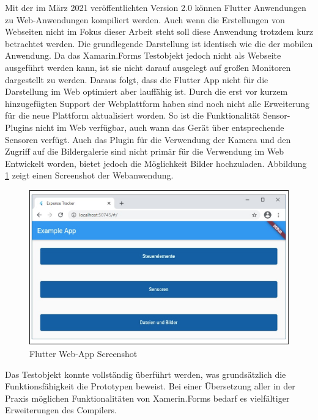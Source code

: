  
Mit der im März 2021 veröffentlichten Version 2.0  können Flutter Anwendungen zu Web-Anwendungen kompiliert werden.  Auch wenn die Erstellungen von Webseiten nicht im Fokus dieser Arbeit steht soll diese Anwendung trotzdem kurz betrachtet werden.  Die grundlegende Darstellung ist identisch wie die der mobilen Anwendung.  Da das Xamarin.Forms Testobjekt jedoch nicht als Webseite ausgeführt werden kann,  ist sie nicht darauf ausgelegt auf großen Monitoren dargestellt zu werden.   Daraus folgt,  dass die Flutter App nicht für die Darstellung im Web optimiert aber lauffähig ist.  Durch die erst vor kurzem hinzugefügten Support der Webplattform haben sind noch nicht alle Erweiterung für die neue Plattform aktualisiert worden.  So ist die Funktionalität Sensor-Plugins nicht im Web verfügbar,  auch wann das Gerät über entsprechende Sensoren verfügt.  Auch das Plugin für die Verwendung der Kamera und den Zugriff auf die Bildergalerie sind nicht primär für die Verwendung im Web Entwickelt worden,  bietet jedoch die Möglichkeit Bilder hochzuladen.  Abbildung \ref{fig:WebView} zeigt einen Screenshot der Webanwendung.
\newpage
\begin{figure}[!ht]
 \includegraphics[width=\textwidth,keepaspectratio]{Images/Implementation/WebApp.png}
 \caption{Flutter Web-App Screenshot}
 \label{fig:WebView}
\end{figure}


Das Testobjekt konnte vollständig überführt werden, was grundsätzlich die 
Funktionsfähigkeit die Prototypen beweist. Bei einer Übersetzung aller in der Praxis möglichen 
Funktionalitäten von Xamerin.Forms bedarf es vielfältiger Erweiterungen des Compilers.


